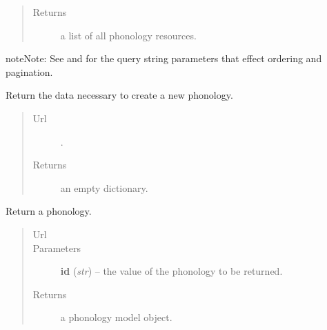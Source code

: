 \documentclass[letterpaper,10pt,english]{sphinxmanual}
\begin{document}
\begin{fulllineitems}
\begin{fulllineitems}
\begin{quote}
\begin{description}
\item[{Returns}] \leavevmode
a list of all phonology resources.

\end{description}\end{quote}

\begin{notice}{note}{Note:}
See  and  for the
query string parameters that effect ordering and pagination.
\end{notice}

\end{fulllineitems}


\begin{fulllineitems}
\label{api:onlinelinguisticdatabase.controllers.phonologies.PhonologiesController.new}
Return the data necessary to create a new phonology.
\begin{quote}\begin{description}
\item[{Url }] \leavevmode
{}.

\item[{Returns}] \leavevmode
an empty dictionary.

\end{description}\end{quote}

\end{fulllineitems}


\begin{fulllineitems}
\label{api:onlinelinguisticdatabase.controllers.phonologies.PhonologiesController.show}
Return a phonology.
\begin{quote}\begin{description}
\item[{Url }] \leavevmode
{}

\item[{Parameters}] \leavevmode
\textbf{id} (\emph{str}) -- the  value of the phonology to be returned.

\item[{Returns}] \leavevmode
a phonology model object.


\end{description}
\end{quote}
\end{fulllineitems}
\end{fulllineitems}
\end{document}
